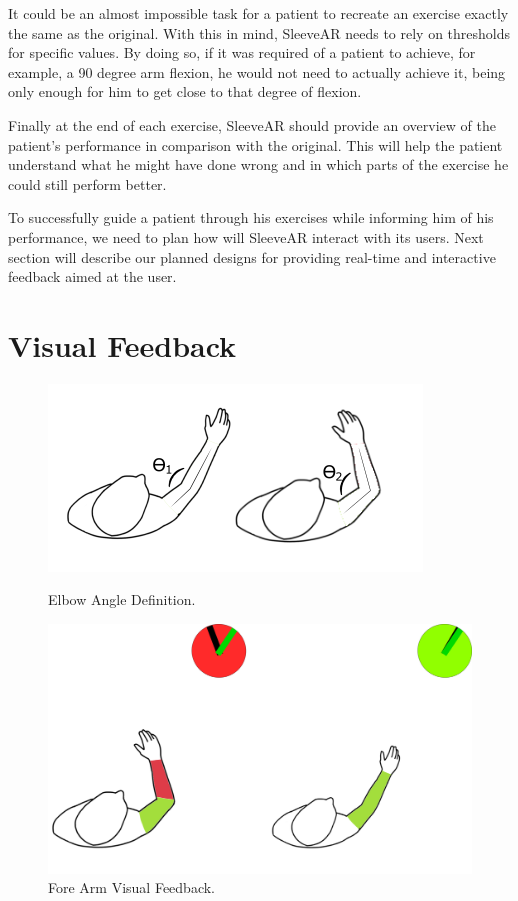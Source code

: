 It could be an almost impossible task for a patient to recreate an exercise exactly the same as the original. 
With this in mind, SleeveAR needs to rely on thresholds for specific values. 
By doing so, if it was required of a patient to achieve, for example, a 90 degree arm flexion, he would not 
need to actually achieve it, being only enough for him to get close to that degree of flexion.

Finally at the end of each exercise, SleeveAR should provide an overview of the patient's performance in comparison with the original. 
This will help the patient understand what he might have done wrong and in which parts of the exercise he could still perform better.

To successfully guide a patient through his exercises while informing him of his performance, we need to plan how will SleeveAR interact with its users. 
Next section will describe our planned designs for providing real-time and interactive feedback aimed at the user.

\section{Visual Feedback}
\label{vision-feedback}


\begin{figure}[!t]
  \centering
  \includegraphics[width=0.7\linewidth]{imgs/approach/elbowangle.png}
    \caption{Elbow Angle Definition.}
    \label{fig:elbowangle}
    \endminipage\hfill
{}
  \centering
  \includegraphics[width=0.9\linewidth]{imgs/approach/forearmfeedback.png}
    \caption{Fore Arm Visual Feedback.}
    \label{fig:forearmfeedback}
    \endminipage
\end{figure}



